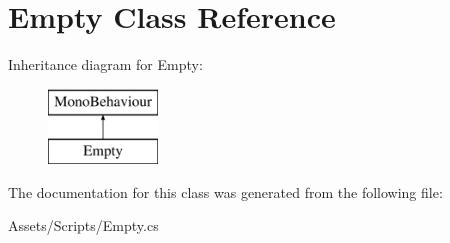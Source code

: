 \hypertarget{class_empty}{}\section{Empty Class Reference}
\label{class_empty}
Inheritance diagram for Empty\+:\begin{figure}[H]
\begin{center}
\leavevmode
\includegraphics[height=2.000000cm]{class_empty}
\end{center}
\end{figure}


The documentation for this class was generated from the following file\+:\begin{DoxyCompactItemize}
\item 
Assets/\+Scripts/Empty.\+cs\end{DoxyCompactItemize}
